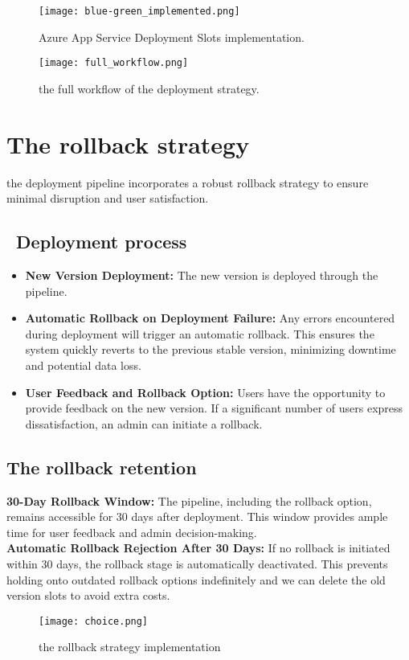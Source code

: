 \begin{figure}[htbp]
    \centering
    \texttt{[image: blue-green\_implemented.png]}
    \caption{Azure App Service Deployment Slots implementation.}
    \label{fig:deployment-slots}
\end{figure}

\begin{figure}[htbp]
    \centering
    \texttt{[image: full\_workflow.png]}
    \caption{the full workflow of the deployment strategy.}
    \label{fig:deployment-strategy-full-workflow}
\end{figure}

\pagebreak
\section{The rollback strategy}
the deployment pipeline incorporates a robust rollback strategy to ensure minimal disruption and user satisfaction.
\subsection*{ \textbullet\ Deployment process}

\begin{itemize}
    \item \textbf{New Version Deployment:} The new version is deployed through the pipeline.
    \item \textbf{Automatic Rollback on Deployment Failure:} Any errors encountered during deployment will trigger an automatic rollback. This ensures the system quickly reverts to the previous stable version, minimizing downtime and potential data loss.
    \item \textbf{User Feedback and Rollback Option:} Users have the opportunity to provide feedback on the new version. If a significant number of users express dissatisfaction, an admin can initiate a rollback.
\end{itemize}

\subsection{The rollback retention}
\textbf{30-Day Rollback Window:}
The pipeline, including the rollback option, remains accessible for 30 days after deployment. This window provides ample time for user feedback and admin decision-making.
\\ \noindent
\textbf{Automatic Rollback Rejection After 30 Days:}
If no rollback is initiated within 30 days, the rollback stage is automatically deactivated. This prevents holding onto outdated rollback options indefinitely and we can delete the old version slots to avoid extra costs.
\\
\begin{figure}[htbp]
    \centering
    \texttt{[image: choice.png]}
    \caption{the rollback strategy implementation}
    \label{fig:rollback-strategy}
\end{figure}

